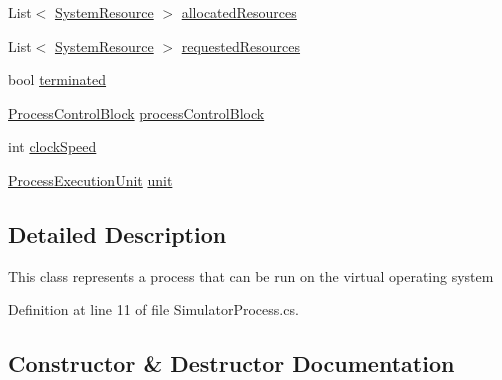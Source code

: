 \begin{DoxyCompactItemize}
List$<$ \hyperlink{class_c_p_u___o_s___simulator_1_1_operating___system_1_1_system_resource}{System\+Resource} $>$ \hyperlink{class_c_p_u___o_s___simulator_1_1_operating___system_1_1_simulator_process_af493fe44d2e40001e847ce762f1fac67}{allocated\+Resources}
\item 
List$<$ \hyperlink{class_c_p_u___o_s___simulator_1_1_operating___system_1_1_system_resource}{System\+Resource} $>$ \hyperlink{class_c_p_u___o_s___simulator_1_1_operating___system_1_1_simulator_process_a93e3c24d4342373d6f0192dce851d269}{requested\+Resources}
\item 
bool \hyperlink{class_c_p_u___o_s___simulator_1_1_operating___system_1_1_simulator_process_a692f144a0d21c56d067063d7c0207af1}{terminated}
\item 
\hyperlink{class_c_p_u___o_s___simulator_1_1_operating___system_1_1_process_control_block}{Process\+Control\+Block} \hyperlink{class_c_p_u___o_s___simulator_1_1_operating___system_1_1_simulator_process_a4b3401c13eab41dc43abd449e8961f18}{process\+Control\+Block}
\item 
int \hyperlink{class_c_p_u___o_s___simulator_1_1_operating___system_1_1_simulator_process_acb5b4680ab904693eb4b519c9f5e5e6e}{clock\+Speed}
\item 
\hyperlink{class_c_p_u___o_s___simulator_1_1_operating___system_1_1_process_execution_unit}{Process\+Execution\+Unit} \hyperlink{class_c_p_u___o_s___simulator_1_1_operating___system_1_1_simulator_process_a8e6c1d85ab2ff692572774c7590e5916}{unit}
\end{DoxyCompactItemize}


\subsection{Detailed Description}
This class represents a process that can be run on the virtual operating system 



Definition at line 11 of file Simulator\+Process.\+cs.



\subsection{Constructor \& Destructor Documentation}
\hypertarget{class_c_p_u___o_s___simulator_1_1_operating___system_1_1_simulator_process_a6d9429aba3440d2bde6e8733eeee232f}{}
